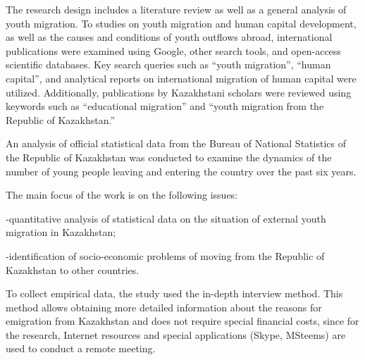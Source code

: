 {The research design includes a literature review as well as a general
analysis of youth migration. To studies on youth migration and human
capital development, as well as the causes and conditions of youth
outflows abroad, international publications were examined using Google,
other search tools, and open-access scientific databases. Key search
queries such as ``youth migration'', ``human capital'', and analytical
reports on international migration of human capital were utilized.
Additionally, publications by Kazakhstani scholars were reviewed using
keywords such as ``educational migration'' and ``youth migration from
the Republic of Kazakhstan.''

An analysis of official statistical data from the Bureau of National
Statistics of the Republic of Kazakhstan was conducted to examine the
dynamics of the number of young people leaving and entering the country
over the past six years.

The main focus of the work is on the following issues:

-quantitative analysis of statistical data on the situation of external
youth migration in Kazakhstan;

-identification of socio-economic problems of moving from the Republic
of Kazakhstan to other countries.

To collect empirical data, the study used the in-depth interview method.
This method allows obtaining more detailed information about the reasons
for emigration from Kazakhstan and does not require special financial
costs, since for the research, Internet resources and special
applications (Skype, MSteems) are used to conduct a remote meeting.

}
